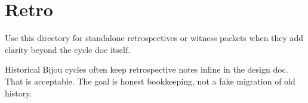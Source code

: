 \chapter{Retro}\label{record-395}

\smallskip

Use this directory for standalone retrospectives or witness packets when they add clarity beyond the cycle doc itself.

Historical Bijou cycles often keep retrospective notes inline in the design doc. That is acceptable. The goal is honest bookkeeping, not a fake migration of old history.

